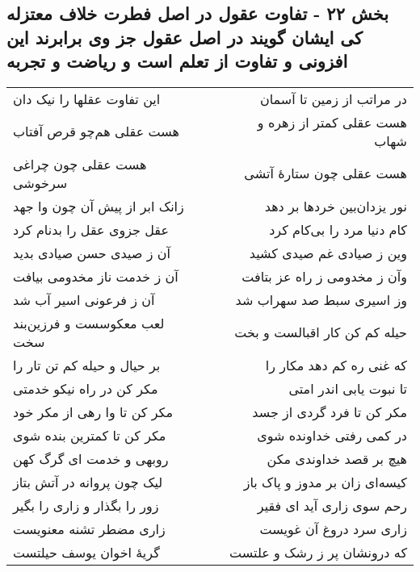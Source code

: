 \begin{center}
\section*{بخش ۲۲ - تفاوت عقول در اصل فطرت خلاف معتزله کی ایشان گویند در اصل عقول جز وی برابرند این افزونی و  تفاوت از تعلم است و ریاضت و تجربه}
\label{sec:sh022}
\begin{longtable}{l p{0.5cm} r}
این تفاوت عقلها را نیک دان
&&
در مراتب از زمین تا آسمان
\\
هست عقلی هم‌چو قرص آفتاب
&&
هست عقلی کمتر از زهره و شهاب
\\
هست عقلی چون چراغی سرخوشی
&&
هست عقلی چون ستارهٔ آتشی
\\
زانک ابر از پیش آن چون وا جهد
&&
نور یزدان‌بین خردها بر دهد
\\
عقل جزوی عقل را بدنام کرد
&&
کام دنیا مرد را بی‌کام کرد
\\
آن ز صیدی حسن صیادی بدید
&&
وین ز صیادی غم صیدی کشید
\\
آن ز خدمت ناز مخدومی بیافت
&&
وآن ز مخدومی ز راه عز بتافت
\\
آن ز فرعونی اسیر آب شد
&&
وز اسیری سبط صد سهراب شد
\\
لعب معکوسست و فرزین‌بند سخت
&&
حیله کم کن کار اقبالست و بخت
\\
بر حیال و حیله کم تن تار را
&&
که غنی ره کم دهد مکار را
\\
مکر کن در راه نیکو خدمتی
&&
تا نبوت یابی اندر امتی
\\
مکر کن تا وا رهی از مکر خود
&&
مکر کن تا فرد گردی از جسد
\\
مکر کن تا کمترین بنده شوی
&&
در کمی رفتی خداونده شوی
\\
روبهی و خدمت ای گرگ کهن
&&
هیچ بر قصد خداوندی مکن
\\
لیک چون پروانه در آتش بتاز
&&
کیسه‌ای زان بر مدوز و پاک باز
\\
زور را بگذار و زاری را بگیر
&&
رحم سوی زاری آید ای فقیر
\\
زاری مضطر تشنه معنویست
&&
زاری سرد دروغ آن غویست
\\
گریهٔ اخوان یوسف حیلتست
&&
که درونشان پر ز رشک و علتست
\\
\end{longtable}
\end{center}
